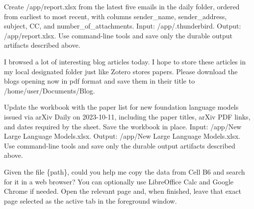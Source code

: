 \begin{instructionbox}
Create \textasciigrave{}/app/report.xlsx\textasciigrave{} from the latest five emails in the \textasciigrave{}daily\textasciigrave{} folder, ordered from earliest to most recent, with columns \textasciigrave{}sender\_name\textasciigrave{}, \textasciigrave{}sender\_address\textasciigrave{}, \textasciigrave{}subject\textasciigrave{}, \textasciigrave{}CC\textasciigrave{}, and \textasciigrave{}number\_of\_attachments\textasciigrave{}.
Input: \textasciigrave{}/app/.thunderbird\textasciigrave{}.
Output: \textasciigrave{}/app/report.xlsx\textasciigrave{}.
Use command-line tools and save only the durable output artifacts described above.
\end{instructionbox}

\begin{instructionbox}
I browsed a lot of interesting blog articles today. I hope to store these articles in my local designated folder just like Zotero stores papers. Please download the blogs opening now in pdf format and save them in their title to \textasciigrave{}/home/user/Documents/Blog\textasciigrave{}.
\end{instructionbox}

\begin{instructionbox}
Update the workbook with the paper list for new foundation language models issued via arXiv Daily on 2023-10-11, including the paper titles, arXiv PDF links, and dates required by the sheet. Save the workbook in place.
Input: \textasciigrave{}/app/New Large Language Models.xlsx\textasciigrave{}.
Output: \textasciigrave{}/app/New Large Language Models.xlsx\textasciigrave{}.
Use command-line tools and save only the durable output artifacts described above.
\end{instructionbox}

\begin{instructionbox}
Given the file \{path\}, could you help me copy the data from Cell B6 and search for it in a web browser? You can optionally use LibreOffice Calc and Google Chrome if needed. Open the relevant page and, when finished, leave that exact page selected as the active tab in the foreground window.
\end{instructionbox}

